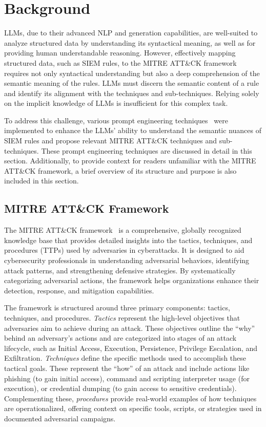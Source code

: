 \section{\label{sec:background}Background}

LLMs, due to their advanced NLP and generation capabilities, are well-suited to analyze structured data by understanding its syntactical meaning, as well as for providing human understandable reasoning. 
However, effectively mapping structured data, such as SIEM rules, to the MITRE ATT\&CK framework~\cite{al2024mitre} requires not only syntactical understanding but also a deep comprehension of the semantic meaning of the rules. 
LLMs must discern the semantic content of a rule and identify its alignment with the techniques and sub-techniques. %
Relying solely on the implicit knowledge of LLMs is insufficient for this complex task.

To address this challenge, various prompt engineering techniques~\cite{sahoo2024systematic} were implemented to enhance the LLMs' ability to understand the semantic nuances of SIEM rules and propose relevant MITRE ATT\&CK techniques and sub-techniques. 
These prompt engineering techniques are discussed in detail in this section.
Additionally, to provide context for readers unfamiliar with the MITRE ATT\&CK framework, a brief overview of its structure and purpose is also included in this section.

\subsection{MITRE ATT\&CK Framework}
The MITRE ATT\&CK framework~\cite{al2024mitre} is a comprehensive, globally recognized knowledge base that provides detailed insights into the tactics, techniques, and procedures (TTPs) used by adversaries in cyberattacks. 
It is designed to aid cybersecurity professionals in understanding adversarial behaviors, identifying attack patterns, and strengthening defensive strategies. 
By systematically categorizing adversarial actions, the framework helps organizations enhance their detection, response, and mitigation capabilities.

The framework is structured around three primary components: tactics, techniques, and procedures. 
\textit{Tactics} represent the high-level objectives that adversaries aim to achieve during an attack. 
These objectives outline the “why” behind an adversary’s actions and are categorized into stages of an attack lifecycle, such as Initial Access, Execution, Persistence, Privilege Escalation, and Exfiltration. 
\textit{Techniques} %
define the specific methods used to accomplish these tactical goals. 
These represent the “how” of an attack and include actions like phishing (to gain initial access), command and scripting interpreter usage (for execution), or credential dumping (to gain access to sensitive credentials). 
Complementing these, \textit{procedures} provide real-world examples of how techniques are operationalized, offering context on specific tools, scripts, or strategies used in documented adversarial campaigns.


